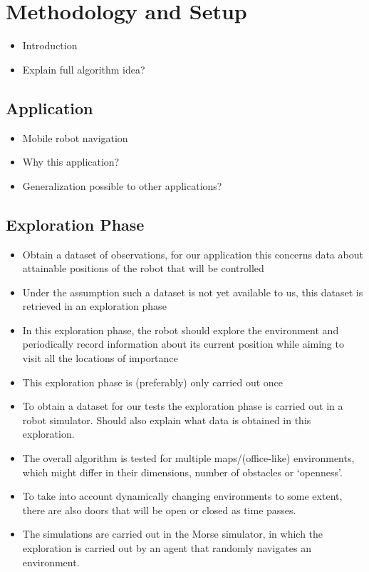 \chapter{Methodology and Setup}
\label{ch:setup}

% 

\begin{itemize}
	\item Introduction
	\item Explain full algorithm idea?
\end{itemize}

\section{Application}
\label{sec:application}

% 

\begin{itemize}
	\item Mobile robot navigation
	\item Why this application?
	\item Generalization possible to other applications?
\end{itemize}

\section{Exploration Phase}
\label{sec:exploration-phase}

% 

\begin{itemize}
	\item Obtain a dataset of observations, for our application this concerns data about attainable positions of the robot that will be controlled
	\item Under the assumption such a dataset is not yet available to us, this dataset is retrieved in an exploration phase
	\item In this exploration phase, the robot should explore the environment and periodically record information about its current position while aiming to visit all the locations of importance
	\item This exploration phase is (preferably) only carried out once
	\item To obtain a dataset for our tests the exploration phase is carried out in a robot simulator. Should also explain what data is obtained in this exploration.
	\item The overall algorithm is tested for multiple maps/(office-like) environments, which might differ in their dimensions, number of obstacles or `openness'.
	\item To take into account dynamically changing environments to some extent, there are also doors that will be open or closed as time passes.
	\item The simulations are carried out in the Morse simulator, in which the exploration is carried out by an agent that randomly navigates an environment.
\end{itemize}

